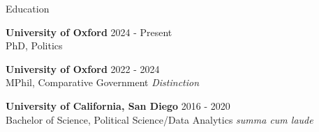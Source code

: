 \documentclass[10pt]{resume} %
\begin{document}
	


\vspace{-4cm}

	
	\begin{rSection}{Education}
		
		{\bf University of Oxford} \hfill {2024 - Present} 
		\\ PhD, Politics
		
		{\bf University of Oxford} \hfill {2022 - 2024} 
		\\ MPhil, Comparative Government \hfill {\em Distinction}
		
		{\bf University of California, San Diego} \hfill {2016 - 2020} 
		\\ Bachelor of Science, Political Science/Data Analytics \hfill {\em summa cum laude}
		
	\end{rSection}
	
	
\end{document}
